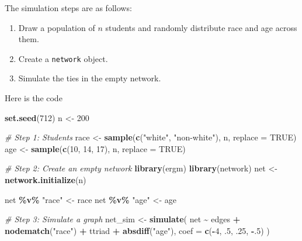 \documentclass[
]{book}
\newenvironment{Shaded}{\begin{snugshade}}{\end{snugshade}}
\newcommand{\AttributeTok}[1]{\textcolor[rgb]{0.13,0.29,0.53}{#1}}
\newcommand{\CommentTok}[1]{\textcolor[rgb]{0.56,0.35,0.01}{\textit{#1}}}
\newcommand{\ConstantTok}[1]{\textcolor[rgb]{0.56,0.35,0.01}{#1}}
\newcommand{\DecValTok}[1]{\textcolor[rgb]{0.00,0.00,0.81}{#1}}
\newcommand{\FunctionTok}[1]{\textcolor[rgb]{0.13,0.29,0.53}{\textbf{#1}}}
\newcommand{\NormalTok}[1]{#1}
\newcommand{\OtherTok}[1]{\textcolor[rgb]{0.56,0.35,0.01}{#1}}
\newcommand{\SpecialCharTok}[1]{\textcolor[rgb]{0.81,0.36,0.00}{\textbf{#1}}}
\newcommand{\StringTok}[1]{\textcolor[rgb]{0.31,0.60,0.02}{#1}}
\begin{document}
The simulation steps are as follows:

\begin{enumerate}
\def\labelenumi{\arabic{enumi}.}
\item
  Draw a population of \(n\) students and randomly distribute race and age across them.
\item
  Create a \texttt{network} object.
\item
  Simulate the ties in the empty network.
\end{enumerate}

Here is the code

\begin{Shaded}
\begin{Highlighting}[]
\FunctionTok{set.seed}\NormalTok{(}\DecValTok{712}\NormalTok{)}
\NormalTok{n }\OtherTok{\textless{}{-}} \DecValTok{200}

\CommentTok{\# Step 1: Students}
\NormalTok{race   }\OtherTok{\textless{}{-}} \FunctionTok{sample}\NormalTok{(}\FunctionTok{c}\NormalTok{(}\StringTok{"white"}\NormalTok{, }\StringTok{"non{-}white"}\NormalTok{), n, }\AttributeTok{replace =} \ConstantTok{TRUE}\NormalTok{)}
\NormalTok{age    }\OtherTok{\textless{}{-}} \FunctionTok{sample}\NormalTok{(}\FunctionTok{c}\NormalTok{(}\DecValTok{10}\NormalTok{, }\DecValTok{14}\NormalTok{, }\DecValTok{17}\NormalTok{), n, }\AttributeTok{replace =} \ConstantTok{TRUE}\NormalTok{)}

\CommentTok{\# Step 2: Create an empty network}
\FunctionTok{library}\NormalTok{(ergm)}
\FunctionTok{library}\NormalTok{(network)}
\NormalTok{net }\OtherTok{\textless{}{-}} \FunctionTok{network.initialize}\NormalTok{(n)}

\NormalTok{net }\SpecialCharTok{\%v\%} \StringTok{"race"}   \OtherTok{\textless{}{-}}\NormalTok{ race}
\NormalTok{net }\SpecialCharTok{\%v\%} \StringTok{"age"}    \OtherTok{\textless{}{-}}\NormalTok{ age}

\CommentTok{\# Step 3: Simulate a graph}
\NormalTok{net\_sim }\OtherTok{\textless{}{-}} \FunctionTok{simulate}\NormalTok{(}
\NormalTok{    net }\SpecialCharTok{\textasciitilde{}}\NormalTok{ edges }\SpecialCharTok{+}
    \FunctionTok{nodematch}\NormalTok{(}\StringTok{"race"}\NormalTok{) }\SpecialCharTok{+}
\NormalTok{    ttriad }\SpecialCharTok{+}
    \FunctionTok{absdiff}\NormalTok{(}\StringTok{"age"}\NormalTok{),}
    \AttributeTok{coef =} \FunctionTok{c}\NormalTok{(}\SpecialCharTok{{-}}\DecValTok{4}\NormalTok{, .}\DecValTok{5}\NormalTok{, .}\DecValTok{25}\NormalTok{, }\SpecialCharTok{{-}}\NormalTok{.}\DecValTok{5}\NormalTok{)}
\NormalTok{    )}
\end{Highlighting}
\end{Shaded}
\end{document}
